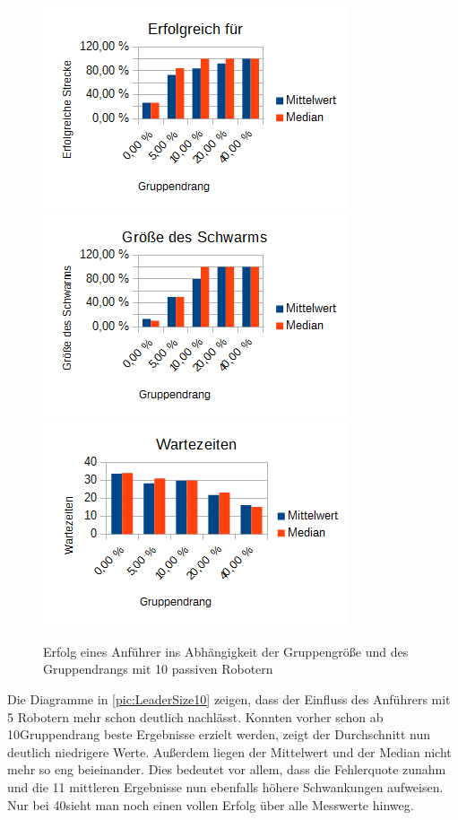 \begin{figure}[h]
	\includegraphics[width=\sectionLeaderPictureWidth , keepaspectratio]{graphics/Statistics/Leader/FlockSize/10_1.png}
	\includegraphics[width=\sectionLeaderPictureWidth , keepaspectratio]{graphics/Statistics/Leader/FlockSize/10_2.png}
	\includegraphics[width=\sectionLeaderPictureWidth , keepaspectratio]{graphics/Statistics/Leader/FlockSize/10_3.png}
	\caption{Erfolg eines Anführer ins Abhängigkeit der Gruppengröße und des Gruppendrangs mit 10 passiven Robotern}
	\label{pic:LeaderSize10}
\end{figure}

Die Diagramme in \autoref{pic:LeaderSize10} zeigen, dass der Einfluss des Anführers mit 5 Robotern mehr schon deutlich nachlässt. Konnten vorher schon ab 10\per Gruppendrang beste Ergebnisse erzielt werden, zeigt der Durchschnitt nun deutlich niedrigere Werte. Außerdem liegen der Mittelwert und der Median nicht mehr so eng beieinander. Dies bedeutet vor allem, dass die Fehlerquote zunahm und die 11 mittleren Ergebnisse nun ebenfalls höhere Schwankungen aufweisen. Nur bei 40\per sieht man noch einen vollen Erfolg über alle Messwerte hinweg.


